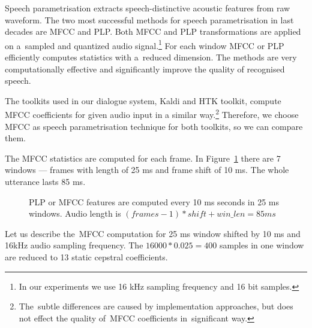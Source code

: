 Speech parametrisation extracts speech-distinctive acoustic features from raw waveform.
The two most successful methods for speech parametrisation in last decades are \ac{MFCC}\cite{davis1980comparison} and \ac{PLP}\cite{hermansky1990perceptual}.
Both \ac{MFCC} and \ac{PLP} transformations are applied on a~sampled and quantized audio signal.\footnote{In our experiments we use 16 kHz sampling frequency and 16 bit samples.} 
For each window \ac{MFCC} or \ac{PLP} efficiently computes statistics with a~reduced dimension. 
The methods are very computationally effective and significantly improve the quality of recognised speech.

The toolkits used in our dialogue system, Kaldi and \ac{HTK} toolkit, compute \ac{MFCC} coefficients for given audio input in a similar way.\footnote{The~subtle differences are caused by implementation approaches, but does not effect the quality of~\ac{MFCC} coefficients in~significant way.}
Therefore, we choose \ac{MFCC} as speech parametrisation technique for both toolkits, so we can compare them.


The \ac{MFCC} statistics are computed for each frame.
In Figure~\ref{fig:mfcc_window} there are 7 windows --- frames with length of 25 ms and frame shift of 10 ms.
The whole utterance lasts 85 ms.

\begin{figure}[!htp]
    \begin{center}
    
    \caption{\ac{PLP} or \ac{MFCC} features are computed every 10 ms seconds in 25 ms windows.
    Audio length is $(frames-1)*shift + win\_len = 85ms$}
    \label{fig:mfcc_window} 
    \end{center}
\end{figure}

Let us describe the~\ac{MFCC} computation for 25 ms window shifted by 10 ms and 16kHz audio sampling frequency. 
The $16000 * 0.025 = 400$ samples in one window are reduced to 13 static cepstral coefficients.

